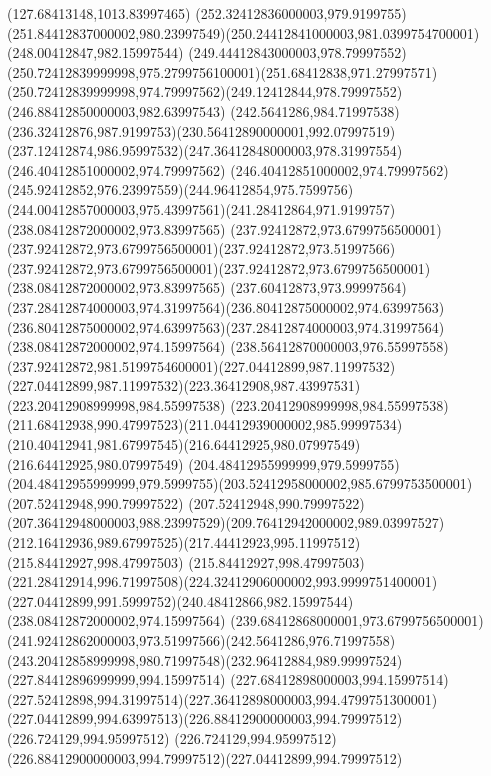 {{	\lineto(127.68413148,1013.83997465)
	\closepath
	\moveto(252.32412836000003,979.9199755)
	\curveto(251.84412837000002,980.23997549)(250.24412841000003,981.0399754700001)(248.00412847,982.15997544)
	\curveto(249.44412843000003,978.79997552)(250.72412839999998,975.2799756100001)(251.68412838,971.27997571)
	\curveto(250.72412839999998,974.79997562)(249.12412844,978.79997552)(246.88412850000003,982.63997543)
	\curveto(242.5641286,984.71997538)(236.32412876,987.9199753)(230.56412890000001,992.07997519)
	\curveto(237.12412874,986.95997532)(247.36412848000003,978.31997554)(246.40412851000002,974.79997562)
	\curveto(246.40412851000002,974.79997562)(245.92412852,976.23997559)(244.96412854,975.7599756)
	\curveto(244.00412857000003,975.43997561)(241.28412864,971.9199757)(238.08412872000002,973.83997565)
	\curveto(237.92412872,973.6799756500001)(237.92412872,973.6799756500001)(237.92412872,973.51997566)
	\curveto(237.92412872,973.6799756500001)(237.92412872,973.6799756500001)(238.08412872000002,973.83997565)
	\curveto(237.60412873,973.99997564)(237.28412874000003,974.31997564)(236.80412875000002,974.63997563)
	\curveto(236.80412875000002,974.63997563)(237.28412874000003,974.31997564)(238.08412872000002,974.15997564)
	\curveto(238.56412870000003,976.55997558)(237.92412872,981.5199754600001)(227.04412899,987.11997532)
	\curveto(227.04412899,987.11997532)(223.36412908,987.43997531)(223.20412908999998,984.55997538)
	\curveto(223.20412908999998,984.55997538)(211.68412938,990.47997523)(211.04412939000002,985.99997534)
	\curveto(210.40412941,981.67997545)(216.64412925,980.07997549)(216.64412925,980.07997549)
	\lineto(204.48412955999999,979.5999755)
	\curveto(204.48412955999999,979.5999755)(203.52412958000002,985.6799753500001)(207.52412948,990.79997522)
	\curveto(207.52412948,990.79997522)(207.36412948000003,988.23997529)(209.76412942000002,989.03997527)
	\curveto(212.16412936,989.67997525)(217.44412923,995.11997512)(215.84412927,998.47997503)
	\curveto(215.84412927,998.47997503)(221.28412914,996.71997508)(224.32412906000002,993.9999751400001)
	\curveto(227.04412899,991.5999752)(240.48412866,982.15997544)(238.08412872000002,974.15997564)
	\curveto(239.68412868000001,973.6799756500001)(241.92412862000003,973.51997566)(242.5641286,976.71997558)
	\curveto(243.20412858999998,980.71997548)(232.96412884,989.99997524)(227.84412896999999,994.15997514)
	\curveto(227.68412898000003,994.15997514)(227.52412898,994.31997514)(227.36412898000003,994.4799751300001)
	\curveto(227.04412899,994.63997513)(226.88412900000003,994.79997512)(226.724129,994.95997512)
	\curveto(226.724129,994.95997512)(226.88412900000003,994.79997512)(227.04412899,994.79997512)
}}

